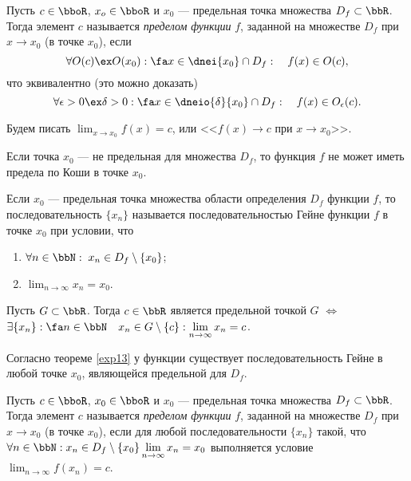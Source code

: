 \begin{defn}\label{exp12} 
Пусть $c\in\bboR$, $x_o \in \bboR$ и $x_0$ --- предельная точка множества $D_f \subset \bbR$. Тогда элемент $c$ называется \textit{пределом функции} $f$, заданной на множестве $D_f$ при $x \to x_0$ (в точке $x_0$), если
$$
\forall O(c) \ex O(x_0): \fa x \in \dnei{x_0}\cap D_f:\quad f(x) \in O(c),
$$  
что эквивалентно (это можно доказать)
$$
\forall \epsilon > 0 \ex \delta >0: \fa x \in \dneio{\delta}{x_0} \cap D_f:\quad f(x) \in O_\epsilon (c). 
$$

Будем писать $\lim_{x \to x_0}\limits f(x) = c$, или <<$f(x)\to c$ при $x \to x_0$>>.
\end{defn}
Если точка $x_0$ --- не предельная для множества $D_f$, то функция $f$ не может иметь предела по Коши в точке $x_0$. %

\begin{defn}
Если $x_0$ --- предельная точка множества области определения $D_f$ функции $f$, то последовательность $\{x_n\}$ называется последовательностью Гейне функции $f$ в точке $x_0$ при условии, что
\begin{enumerate}
\item $\forall n \in \bbN:\; x_n\in D_f\setminus \{x_0\}$;
\item $\lim_{n \to \infty}\limits x_n = x_0$.
\end{enumerate}

\begin{thm}
\label{exp13}
Пусть $G \subset \bbR$. Тогда $c \in \bbR$ является предельной точкой $G$ $\Longleftrightarrow$ $ \exists \{x_n\}: \fa n \in \bbN \quad x_n \in G\setminus\{c\}: \lim_{n \to \infty}\limits x_n = c$. 
\end{thm}

Согласно теореме \ref{exp13} у функции существует последовательность Гейне в любой точке $x_0$, являющейся предельной для $D_f$.
\end{defn}

\begin{defn}\label{exp11} 
Пусть $c\in\bboR$, $x_0 \in \bboR$ и $x_0$ --- предельная точка множества $D_f \subset \bbR$. Тогда элемент $c$ называется \textit{пределом функции} $f$, заданной на множестве $D_f$ при $x \to x_0$ (в точке $x_0$), если для любой последовательности $\{x_n\}$ такой, что $\forall n \in \bbN: x_n\in D_f\setminus \{x_0\} \lim_{n \to \infty}\limits x_n = x_0$ выполняется условие $\lim_{n \to \infty}\limits f(x_n) = c$. 
\end{defn}


